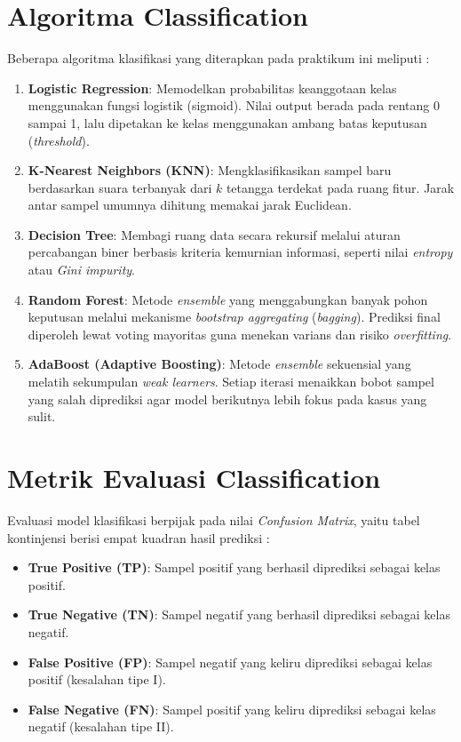 \documentclass[a4paper,oneside,12pt]{report}
\begin{document}
\section{Algoritma Classification}
Beberapa algoritma klasifikasi yang diterapkan pada praktikum ini meliputi \cite{ref6}:
\begin{enumerate}
    \item \textbf{Logistic Regression}: Memodelkan probabilitas keanggotaan kelas menggunakan fungsi logistik (sigmoid). Nilai output berada pada rentang 0 sampai 1, lalu dipetakan ke kelas menggunakan ambang batas keputusan (\textit{threshold}).
    \item \textbf{K-Nearest Neighbors (KNN)}: Mengklasifikasikan sampel baru berdasarkan suara terbanyak dari $k$ tetangga terdekat pada ruang fitur. Jarak antar sampel umumnya dihitung memakai jarak Euclidean.
    \item \textbf{Decision Tree}: Membagi ruang data secara rekursif melalui aturan percabangan biner berbasis kriteria kemurnian informasi, seperti nilai \textit{entropy} atau \textit{Gini impurity}.
    \item \textbf{Random Forest}: Metode \textit{ensemble} yang menggabungkan banyak pohon keputusan melalui mekanisme \textit{bootstrap aggregating} (\textit{bagging}). Prediksi final diperoleh lewat voting mayoritas guna menekan varians dan risiko \textit{overfitting}.
    \item \textbf{AdaBoost (Adaptive Boosting)}: Metode \textit{ensemble} sekuensial yang melatih sekumpulan \textit{weak learners}. Setiap iterasi menaikkan bobot sampel yang salah diprediksi agar model berikutnya lebih fokus pada kasus yang sulit.
\end{enumerate}

\section{Metrik Evaluasi Classification}
Evaluasi model klasifikasi berpijak pada nilai \textit{Confusion Matrix}, yaitu tabel kontinjensi berisi empat kuadran hasil prediksi \cite{ref4}:
\begin{itemize}
    \item \textbf{True Positive (TP)}: Sampel positif yang berhasil diprediksi sebagai kelas positif.
    \item \textbf{True Negative (TN)}: Sampel negatif yang berhasil diprediksi sebagai kelas negatif.
    \item \textbf{False Positive (FP)}: Sampel negatif yang keliru diprediksi sebagai kelas positif (kesalahan tipe I).
    \item \textbf{False Negative (FN)}: Sampel positif yang keliru diprediksi sebagai kelas negatif (kesalahan tipe II).
\end{itemize}
\end{document}
